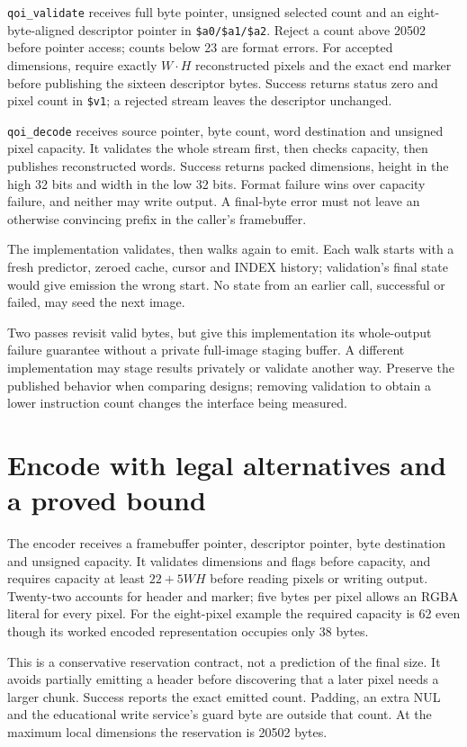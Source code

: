 \texttt{qoi\_validate} receives full byte pointer, unsigned selected count and
an eight-byte-aligned descriptor pointer in \texttt{\$a0/\$a1/\$a2}. Reject a
count above 20502 before pointer access; counts below 23 are format errors.
For accepted dimensions, require exactly $W\cdot H$ reconstructed pixels and
the exact end marker before publishing the sixteen descriptor bytes. Success
returns status zero and pixel count in \texttt{\$v1}; a rejected stream leaves
the descriptor unchanged.

\texttt{qoi\_decode} receives source pointer, byte count, word destination and
unsigned pixel capacity. It validates the whole stream first, then checks
capacity, then publishes reconstructed words. Success returns packed dimensions,
height in the high 32 bits and width in the low 32 bits. Format failure wins over
capacity failure, and neither may write output. A final-byte error must not
leave an otherwise convincing prefix in the caller's framebuffer.

The implementation validates, then walks again to emit. Each walk starts with
a fresh predictor, zeroed cache, cursor and INDEX history; validation's final
state would give emission the wrong start. No state from an earlier call,
successful or failed, may seed the next image.

Two passes revisit valid bytes, but give this implementation its whole-output
failure guarantee without a private full-image staging buffer. A different
implementation may stage results privately or validate another way. Preserve
the published behavior when comparing designs; removing validation to obtain
a lower instruction count changes the interface being measured.

\section{Encode with legal alternatives and a proved bound}

The encoder receives a framebuffer pointer, descriptor pointer, byte destination
and unsigned capacity. It validates dimensions and flags before capacity, and
requires capacity at least $22+5WH$ before reading pixels or writing output.
Twenty-two accounts for header and marker; five bytes per pixel allows an RGBA
literal for every pixel. For the eight-pixel example the required capacity is
62 even though its worked encoded representation occupies only 38 bytes.

This is a conservative reservation contract, not a prediction of the final size.
It avoids partially emitting a header before discovering that a later pixel
needs a larger chunk. Success reports the exact emitted count. Padding, an
extra NUL and the educational write service's guard byte are outside that count.
At the maximum local dimensions the reservation is 20502 bytes.

